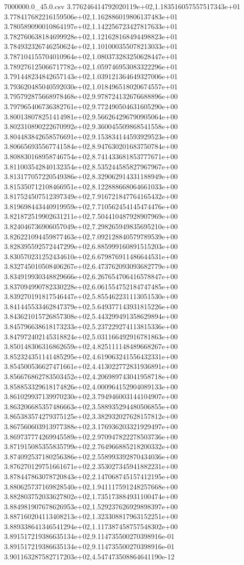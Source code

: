 \begin{filecontents*}{7000000.0_45.0.csv}
3.776246414792020119e+02,1.183516057557517343e+01
3.778417682216159506e+02,1.162886019806137483e+01
3.780589090010864197e+02,1.142256723427817633e+01
3.782760638184699928e+02,1.121628168494498823e+01
3.784932326746250624e+02,1.101000355078213033e+01
3.787104155704010964e+02,1.080373283250628447e+01
3.789276125066717782e+02,1.059746953083322296e+01
3.791448234842657143e+02,1.039121364649327006e+01
3.793620485040592030e+02,1.018496518020674557e+01
3.795792875668978468e+02,9.978724132676688896e+00
3.797965406736382761e+02,9.772490504631605290e+00
3.800138078251414981e+02,9.566264296790905064e+00
3.802310890222670992e+02,9.360045509868541558e+00
3.804483842658576691e+02,9.153834144593929523e+00
3.806656935567741584e+02,8.947630201683750784e+00
3.808830168958746754e+02,8.741433681853777671e+00
3.811003542840132354e+02,8.535244585827967967e+00
3.813177057220549386e+02,8.329062914331188949e+00
3.815350712108466951e+02,8.122888668064661033e+00
3.817524507512397349e+02,7.916721847764165432e+00
3.819698443440919959e+02,7.710562454145474476e+00
3.821872519902631211e+02,7.504410487928907969e+00
3.824046736906057049e+02,7.298265949835695210e+00
3.826221094459877463e+02,7.092128840579789539e+00
3.828395592572447299e+02,6.885999160891515203e+00
3.830570231252434610e+02,6.679876911486644531e+00
3.832745010508406267e+02,6.473762093093682779e+00
3.834919930348829666e+02,6.267654706416578847e+00
3.837094990782330228e+02,6.061554752184747485e+00
3.839270191817546447e+02,5.855462231113051530e+00
3.841445533462847379e+02,5.649377143931815226e+00
3.843621015726857308e+02,5.443299491358629894e+00
3.845796638618173233e+02,5.237229274113815336e+00
3.847972402145318824e+02,5.031166492916781863e+00
3.850148306316862659e+02,4.825111148489668267e+00
3.852324351141485295e+02,4.619063241556432331e+00
3.854500536627471661e+02,4.413022772831936891e+00
3.856676862783503452e+02,4.206989743041958718e+00
3.858853329618174826e+02,4.000964152904089133e+00
3.861029937139970230e+02,3.794946003144104907e+00
3.863206685357486663e+02,3.588935294480506855e+00
3.865383574279375125e+02,3.382932027628157812e+00
3.867560603913977388e+02,3.176936203321929497e+00
3.869737774269945589e+02,2.970947822278503736e+00
3.871915085355835799e+02,2.764966885218200332e+00
3.874092537180256386e+02,2.558993392870434036e+00
3.876270129751661671e+02,2.353027345941882231e+00
3.878447863078720843e+02,2.147068745157412195e+00
3.880625737169828540e+02,1.941117591248257668e+00
3.882803752033627802e+02,1.735173884931100474e+00
3.884981907678626953e+02,1.529237626929898397e+00
3.887160204113408213e+02,1.323308817963152251e+00
3.889338641346541294e+02,1.117387458757548302e+00
3.891517219386635134e+02,9.114735500270398916e-01
3.891517219386635134e+02,9.114735500270398916e-01
3.901163287582717203e+02,4.547473508864641190e-12
\end{filecontents*}

